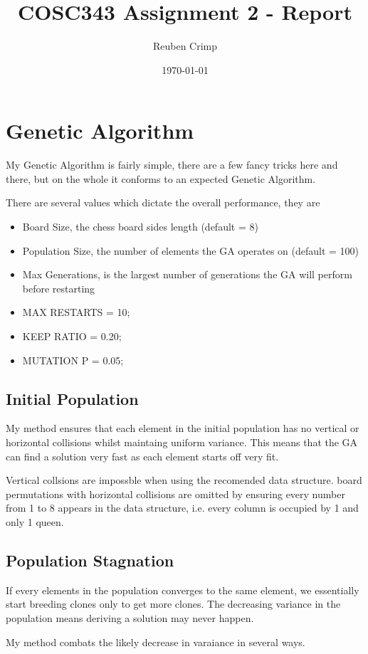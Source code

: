 \documentclass[a4paper,11pt]{article}
\title{COSC343 Assignment 2 - Report}
\author{Reuben Crimp}
\date{\today}
\begin{document}
\maketitle

\section*{Genetic Algorithm}
My Genetic Algorithm is fairly simple, there are a few fancy tricks here and there, but on the whole it conforms to an expected Genetic Algorithm.

There are several values which dictate the overall performance, they are
\begin{itemize}
  \item Board Size, the chess board sides length (default = 8)
  \item Population Size, the number of elements the GA operates on (default = 100)
  \item Max Generations, is the largest number of generations the GA will perform before restarting
  \item MAX RESTARTS = 10;
  \item KEEP RATIO = 0.20;
  \item MUTATION P = 0.05;
\end{itemize}

\subsection*{Initial Population}
My method ensures that each element in the initial population has no vertical or horizontal collisions whilst maintaing uniform variance. This means that the GA can find a solution very fast as each element starts off very fit. 

Vertical collsions are impossble when using the recomended data structure. board permutations with horizontal collisions are omitted by ensuring every number from 1 to 8 appears in the data structure, i.e. every column is occupied by 1 and only 1 queen.
\subsection*{Population Stagnation}
If every elements in the population converges to the same element, we essentially start breeding clones only to get more clones. The decreasing variance in the population means deriving a solution may never happen.

My method combats the likely decrease in varaiance in several ways.
\end{document}
